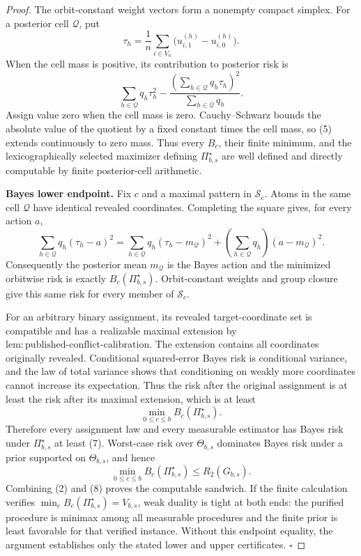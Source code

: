 \documentclass{article}
\begin{document}
\begin{proof}
The orbit-constant weight vectors form a nonempty compact simplex. For a posterior cell \(\mathcal Q\), put
\[
\tau_h=\frac1n\sum_{i\in V_n}\bigl(u^{(h)}_{i,1}-u^{(h)}_{i,0}\bigr).
\]
When the cell mass is positive, its contribution to posterior risk is
\[
\sum_{h\in\mathcal Q}q_h\tau_h^2
-\frac{\left(\sum_{h\in\mathcal Q}q_h\tau_h\right)^2}
{\sum_{h\in\mathcal Q}q_h}.
\tag{5}
\]
Assign value zero when the cell mass is zero. Cauchy--Schwarz bounds the absolute value of the quotient by a fixed constant times the cell mass, so (5) extends continuously to zero mass. Thus every \(B_c\), their finite minimum, and the lexicographically selected maximizer defining \(\Pi_{b,s}^{\star}\) are well defined and directly computable by finite posterior-cell arithmetic.

\textbf{Bayes lower endpoint.}
Fix \(c\) and a maximal pattern in \(\mathcal S_c\). Atoms in the same cell \(\mathcal Q\) have identical revealed coordinates. Completing the square gives, for every action \(a\),
\[
\sum_{h\in\mathcal Q}q_h(\tau_h-a)^2
=\sum_{h\in\mathcal Q}q_h(\tau_h-m_{\mathcal Q})^2
+\left(\sum_{h\in\mathcal Q}q_h\right)(a-m_{\mathcal Q})^2.
\tag{6}
\]
Consequently the posterior mean \(m_{\mathcal Q}\) is the Bayes action and the minimized orbitwise risk is exactly \(B_c(\Pi_{b,s}^{\star})\). Orbit-constant weights and group closure give this same risk for every member of \(\mathcal S_c\).

For an arbitrary binary assignment, its revealed target-coordinate set is compatible and has a realizable maximal extension by \(\mathrm{lem{:}published\text{-}conflict\text{-}calibration}\). The extension contains all coordinates originally revealed. Conditional squared-error Bayes risk is conditional variance, and the law of total variance shows that conditioning on weakly more coordinates cannot increase its expectation. Thus the risk after the original assignment is at least the risk after its maximal extension, which is at least
\[
\min_{0\leq c\leq b}B_c(\Pi_{b,s}^{\star}).
\tag{7}
\]
Therefore every assignment law and every measurable estimator has Bayes risk under \(\Pi_{b,s}^{\star}\) at least (7). Worst-case risk over \(\Theta_{b,s}\) dominates Bayes risk under a prior supported on \(\Theta_{b,s}\), and hence
\[
\min_{0\leq c\leq b}B_c(\Pi_{b,s}^{\star})
\leq R_2(G_{b,s}).
\tag{8}
\]
Combining (2) and (8) proves the computable sandwich. If the finite calculation verifies \(\min_cB_c(\Pi_{b,s}^{\star})=V_{b,s}\), weak duality is tight at both ends: the purified procedure is minimax among all measurable procedures and the finite prior is least favorable for that verified instance. Without this endpoint equality, the argument establishes only the stated lower and upper certificates. \(\square\)
\end{proof}
\end{document}

